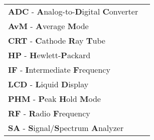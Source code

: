 \documentclass[11pt]{report}
\begin{document}




\glsresetall

\tableofcontents
\listoffigures

\printnoidxglossary[type=\acronymtype,nonumberlist,title={Abbreviations}]
\begin{table}[!ht]
	\begin{tabular}{ll}
		\textbf{ADC} - \textbf{A}nalog-to-\textbf{D}igital \textbf{C}onverter & \\
		\textbf{AvM} - \textbf{A}verage \textbf{M}ode & \\
		\textbf{CRT} - \textbf{C}athode \textbf{R}ay \textbf{T}ube & \\
		\textbf{HP} - \textbf{H}ewlett-\textbf{P}ackard &\\
		\textbf{IF} - \textbf{I}ntermediate \textbf{F}requency & \\
		\textbf{LCD} - \textbf{L}iquid \textbf{D}isplay & \\
		\textbf{PHM} - \textbf{P}eak \textbf{H}old \textbf{M}ode & \\
		\textbf{RF} - \textbf{R}adio \textbf{F}requency & \\
		\textbf{SA} - \textbf{S}ignal/\textbf{S}pectrum \textbf{A}nalyzer & 
	\end{tabular}
\end{table}


\newpage










\newpage


%
\end{document}
